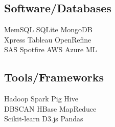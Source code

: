 \documentclass[]{deedy-resume-openfont}
\begin{document}
\begin{minipage}[t]{0.31\textwidth}
\subsection{Software/Databases}
\textbullet{} MemSQL \textbullet{} SQLite \textbullet{} MongoDB  \\
\textbullet{} Xpress \textbullet{} Tableau \textbullet{} OpenRefine \\
\textbullet{} SAS \textbullet{} Spotfire \textbullet{} AWS \textbullet{} Azure ML
\sectionsep

\subsection{Tools/Frameworks}
\textbullet{} Hadoop \textbullet{} Spark \textbullet{} Pig \textbullet{} Hive \\ \textbullet{} DBSCAN \textbullet{} HBase \textbullet{} MapReduce \\
\textbullet{} Scikit-learn \textbullet{} D3.js \textbullet{} Pandas 
\sectionsep

%
%

\end{minipage} 
\hfill
\end{document}
